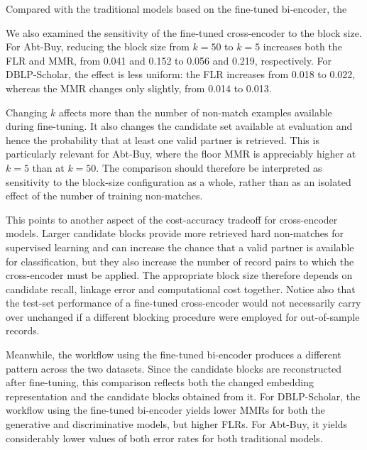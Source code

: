 Compared with the traditional models based on the fine-tuned bi-encoder, the

We also examined the sensitivity of the fine-tuned cross-encoder to the
block size. For Abt-Buy, reducing the block size from $k=50$ to $k=5$ increases
both the FLR and MMR, from 0.041 and 0.152 to 0.056 and 0.219, respectively.
For DBLP-Scholar, the effect is less uniform: the FLR increases from 0.018 to
0.022, whereas the MMR changes only slightly, from 0.014 to 0.013.

Changing $k$ affects more than the number of non-match examples available during
fine-tuning. It also changes the candidate set available at evaluation and hence the
probability that at least one valid partner is retrieved. This is particularly relevant
for Abt-Buy, where the floor MMR is appreciably higher at $k=5$ than at $k=50$.
The comparison should therefore be interpreted as sensitivity to the block-size
configuration as a whole, rather than as an isolated effect of the number of training
non-matches.

This points to another aspect of the cost-accuracy tradeoff for
cross-encoder models. Larger candidate blocks provide more retrieved hard
non-matches for supervised learning and can increase the chance that a valid
partner is available for classification, but they also increase the number of
record pairs to which the cross-encoder must be applied. The appropriate block
size therefore depends on candidate recall, linkage error and computational cost
together. Notice also that the test-set performance of a fine-tuned cross-encoder
would not necessarily carry over unchanged if a different blocking procedure were
employed for out-of-sample records.

Meanwhile, the workflow using the fine-tuned bi-encoder produces a different
pattern across the two datasets. Since the candidate blocks are reconstructed after
fine-tuning, this comparison reflects both the changed embedding representation and
the candidate blocks obtained from it. For DBLP-Scholar, the workflow using the
fine-tuned bi-encoder yields lower MMRs for both the generative and discriminative
models, but higher FLRs. For Abt-Buy, it yields considerably lower values of both
error rates for both traditional models. 

